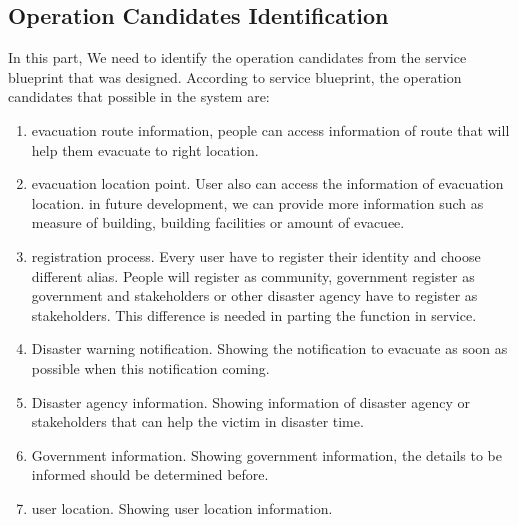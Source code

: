 \subsection{Operation Candidates Identification}
In this part, We need to identify the operation candidates from the service blueprint that was designed. According to service blueprint, the operation candidates that possible in the system  are:
\begin{enumerate}
\setlength{\itemsep}{1.5pt}
\setlength{\parskip}{1.5pt}
\item evacuation route information, people can access information of route that will help them evacuate to right location.
\item evacuation location point. User also can access the information of evacuation location.  in future development, we can provide more information such as measure of building, building facilities or amount of evacuee.
\item registration process. Every user have to register their identity and choose different alias. People will register as community, government register as government and stakeholders or other disaster agency have to register as stakeholders. This difference is needed in parting the function in service.
\item Disaster warning notification. Showing the notification to evacuate as soon as possible when this notification coming.
\item Disaster agency information. Showing information of disaster agency or stakeholders that can help the victim in disaster time.
\item Government information. Showing government information, the details to be informed should be determined before.
\item user location. Showing user location information.
\end{enumerate}


